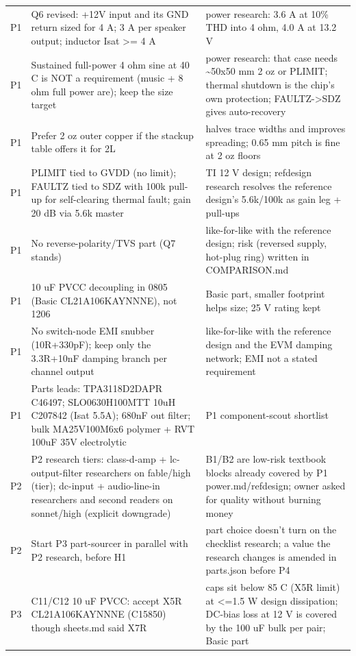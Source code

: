 \documentclass[11pt,a4paper]{article}
\begin{document}
{\begin{longtable}{lp{5.2cm}p{7.2cm}}
P1 & Q6 revised: +12V input and its GND return sized for 4 A; 3 A per speaker output; inductor Isat \textgreater{}= 4 A & power research: 3.6 A at 10\% THD into 4 ohm, 4.0 A at 13.2 V \\
P1 & Sustained full-power 4 ohm sine at 40 C is NOT a requirement (music + 8 ohm full power are); keep the size target & power research: that case needs \textasciitilde{}50x50 mm 2 oz or PLIMIT; thermal shutdown is the chip's own protection; FAULTZ-\textgreater{}SDZ gives auto-recovery \\
P1 & Prefer 2 oz outer copper if the stackup table offers it for 2L & halves trace widths and improves spreading; 0.65 mm pitch is fine at 2 oz floors \\
P1 & PLIMIT tied to GVDD (no limit); FAULTZ tied to SDZ with 100k pull-up for self-clearing thermal fault; gain 20 dB via 5.6k master & TI 12 V design; refdesign research resolves the reference design's 5.6k/100k as gain leg + pull-ups \\
P1 & No reverse-polarity/TVS part (Q7 stands) & like-for-like with the reference design; risk (reversed supply, hot-plug ring) written in COMPARISON.md \\
P1 & 10 uF PVCC decoupling in 0805 (Basic CL21A106KAYNNNE), not 1206 & Basic part, smaller footprint helps size; 25 V rating kept \\
P1 & No switch-node EMI snubber (10R+330pF); keep only the 3.3R+10nF damping branch per channel output & like-for-like with the reference design and the EVM damping network; EMI not a stated requirement \\
P1 & Parts leads: TPA3118D2DAPR C46497; SLO0630H100MTT 10uH C207842 (Isat 5.5A); 680nF out filter; bulk MA25V100M6x6 polymer + RVT 100uF 35V electrolytic & P1 component-scout shortlist \\
P2 & P2 research tiers: class-d-amp + lc-output-filter researchers on fable/high (tier); dc-input + audio-line-in researchers and second readers on sonnet/high (explicit downgrade) & B1/B2 are low-risk textbook blocks already covered by P1 power.md/refdesign; owner asked for quality without burning money \\
P2 & Start P3 part-sourcer in parallel with P2 research, before H1 & part choice doesn't turn on the checklist research; a value the research changes is amended in parts.json before P4 \\
P3 & C11/C12 10 uF PVCC: accept X5R CL21A106KAYNNNE (C15850) though sheets.md said X7R & caps sit below 85 C (X5R limit) at \textless{}=1.5 W design dissipation; DC-bias loss at 12 V is covered by the 100 uF bulk per pair; Basic part \\

\end{longtable}}
\end{document}
